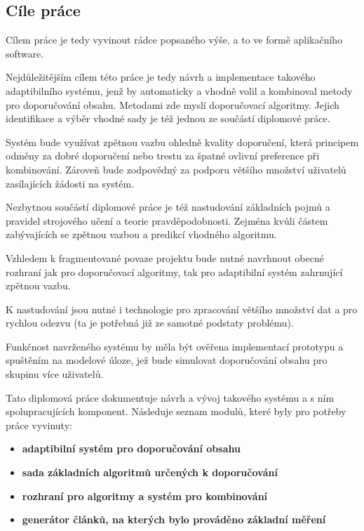 \documentclass[thesis=M,czech]{FITthesis}[2014/05/07]
\begin{document}
\begin{introduction}
\section{Cíle práce}
\label{sec:objectives}
	Cílem práce je tedy vyvinout rádce popsaného výše, a to ve formě aplikačního software. 

	Nejdůležitějším cílem této práce je tedy návrh a implementace takového adaptibilního systému, jenž by automaticky a vhodně volil a kombinoval metody pro doporučování obsahu. Metodami zde myslí doporučovací algoritmy. Jejich identifikace a výběr vhodné sady je též jednou ze součástí diplomové práce.
	
	Systém bude využívat zpětnou vazbu ohledně kvality doporučení, která principem odměny za dobré doporučení nebo trestu za špatné ovlivní preference při kombinování. Zároveň bude zodpovědný za podporu většího množství uživatelů zasílajících žádosti na systém.
	
	Nezbytnou součástí diplomové práce je též nastudování základních pojmů a pravidel strojového učení a teorie pravděpodobnosti. Zejména kvůli částem zabývajících se zpětnou vazbou a predikcí vhodného algoritmu. 
	
	Vzhledem k fragmentované povaze projektu bude nutné navrhnout obecné rozhraní jak pro doporučovací algoritmy, tak pro adaptibilní systém zahrnující zpětnou vazbu.
	
	K nastudování jsou nutné i technologie pro zpracování většího množství dat a pro rychlou odezvu (ta je potřebná již ze samotné podstaty problému).
	
	Funkčnost navrženého systému by měla být ověřena implementací prototypu a spuštěním na modelové úloze, jež bude simulovat doporučování obsahu pro skupinu více uživatelů.
	
	Tato diplomová práce dokumentuje návrh a vývoj takového systému a s ním spolupracujících komponent. Následuje seznam modulů, které byly pro potřeby práce vyvinuty:

\begin{itemize}
  \item \textbf{adaptibilní systém pro doporučování obsahu}
  \item \textbf{sada základních algoritmů určených k doporučování}
  \item \textbf{rozhraní pro algoritmy a systém pro kombinování}
  \item \textbf{generátor článků, na kterých bylo prováděno základní měření}
\end{itemize}	


\end{introduction}
\end{document}
